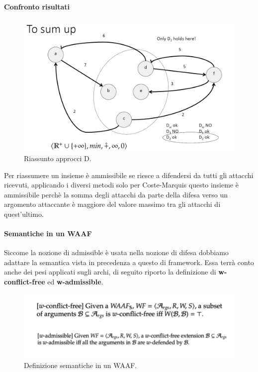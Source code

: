 \paragraph{Confronto risultati}
\begin{figure}[H]
    \centering
    \includegraphics[width=13cm, keepaspectratio]{img/riassunto_d_waaf.png}
    \caption{Riassunto approcci D.}\label{fig:riassunto_d_waaf}
\end{figure}
Per riassumere un insieme è ammissibile se riesce a difendersi da tutti gli attacchi ricevuti, applicando i diversi metodi solo per Coste-Marquis questo insieme è ammissibile perchè la somma degli attacchi da parte della difesa verso un argomento attaccante è maggiore del valore massimo tra gli attacchi di quest'ultimo.

\paragraph{Semantiche in un WAAF}
Siccome la nozione di admissible è usata nella nozione di difesa dobbiamo adattare la semantica vista in precedenza a questo di framework. Essa terrà conto anche dei pesi applicati sugli archi, di seguito riporto la definizione di \textbf{w-conflict-free} ed \textbf{w-admissible}.
\begin{figure}[H]
    \centering
    \includegraphics[width=14cm, keepaspectratio]{img/w_semantiche.png}
    \caption{Definizione semantiche in un WAAF.}\label{fig:w_semantiche}
\end{figure}


